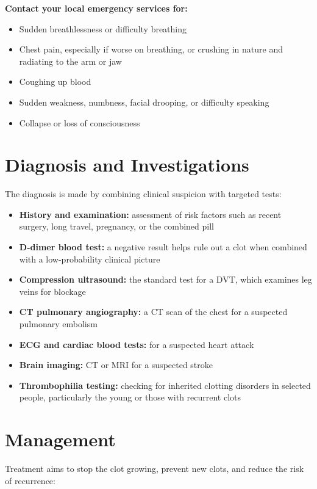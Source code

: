 \textbf{Contact your local emergency services for:}
\begin{itemize}
    \item Sudden breathlessness or difficulty breathing
    \item Chest pain, especially if worse on breathing, or crushing in nature and radiating to the arm or jaw
    \item Coughing up blood
    \item Sudden weakness, numbness, facial drooping, or difficulty speaking
    \item Collapse or loss of consciousness
\end{itemize}

\section*{Diagnosis and Investigations}
The diagnosis is made by combining clinical suspicion with targeted tests:

\begin{itemize}
    \item \textbf{History and examination:} assessment of risk factors such as recent surgery, long travel, pregnancy, or the combined pill
    \item \textbf{D-dimer blood test:} a negative result helps rule out a clot when combined with a low-probability clinical picture
    \item \textbf{Compression ultrasound:} the standard test for a DVT, which examines leg veins for blockage
    \item \textbf{CT pulmonary angiography:} a CT scan of the chest for a suspected pulmonary embolism
    \item \textbf{ECG and cardiac blood tests:} for a suspected heart attack
    \item \textbf{Brain imaging:} CT or MRI for a suspected stroke
    \item \textbf{Thrombophilia testing:} checking for inherited clotting disorders in selected people, particularly the young or those with recurrent clots
\end{itemize}

\section*{Management}
Treatment aims to stop the clot growing, prevent new clots, and reduce the risk of recurrence:

